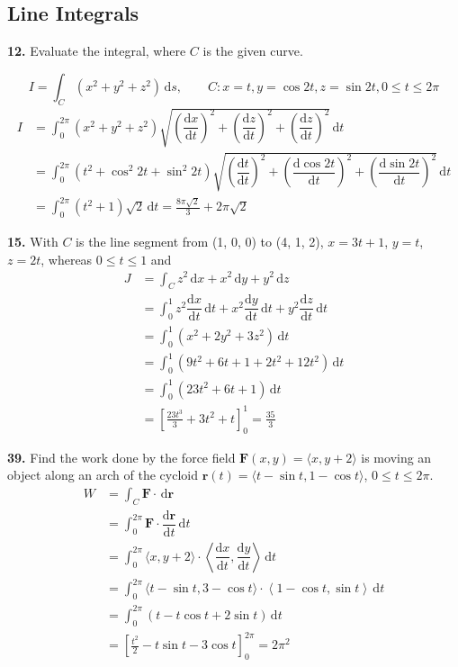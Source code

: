 \documentclass[a4paper,12pt]{article}
\newcommand{\ud}{\,\mathrm{d}}
\newcommand{\leibniz}[3][]{\dfrac{\mathrm{d} #1 #2}{\mathrm{d} #3 #1}}
\newcommand{\exercise}[1]{\noindent\textbf{#1.}}
\begin{document}
\subsection{Line Integrals}
\exercise{12} Evaluate the integral, where $C$ is the given curve.

\[I = \int_C(x^2 + y^2 + z^2)\ud s,\qquad
C: x = t, y = \cos 2t, z = \sin 2t, 0 \leq t \leq 2\pi\]
\begin{align*}
  I &= \int_0^{2\pi}(x^2 + y^2 + z^2)\sqrt{\left(\leibniz{x}{t}\right)^2
  + \left(\leibniz{z}{t}\right)^2 + \left(\leibniz{z}{t}\right)^2}\ud t\\
  &= \int_0^{2\pi}(t^2 + \cos^2 2t + \sin^2 2t)
  \sqrt{\left(\leibniz{t}{t}\right)^2 + \left(\leibniz{\cos 2t}{t}\right)^2
  + \left(\leibniz{\sin 2t}{t}\right)^2}\ud t\\
  &= \int_0^{2\pi}(t^2 + 1)\sqrt 2\ud t = \frac{8\pi\sqrt 2}{3} + 2\pi\sqrt 2
\end{align*}

\exercise{15} With $C$ is the line segment from (1, 0, 0) to (4, 1, 2),
$x = 3t + 1$, $y = t$, $z = 2t$, whereas $0 \leq t \leq 1$ and
\begin{align*}
  J &= \int_C z^2\ud x + x^2\ud y + y^2\ud z\\
  &= \int_0^1 z^2\leibniz{x}{t}\ud t + x^2\leibniz{y}{t}\ud t
  + y^2\leibniz{z}{t}\ud t\\
  &= \int_0^1(x^2 + 2y^2 + 3z^2)\ud t\\
  &= \int_0^1(9t^2 + 6t + 1 + 2t^2 + 12t^2)\ud t\\
  &= \int_0^1(23t^2 + 6t + 1)\ud t\\
  &= \left[\frac{23t^3}{3} + 3t^2 + t\right]_0^1 = \frac{35}{3}
\end{align*}

\exercise{39} Find the work done by the force field
$\mathbf F(x, y) = \langle x, y + 2\rangle$ is moving an object along an arch
of the cycloid $\mathbf r(t) = \langle t-\sin t, 1-\cos t\rangle$,
$0 \leq t \leq 2\pi$.
\begin{align*}
  W &= \int_C\mathbf F\cdot\ud\mathbf r\\
  &= \int_0^{2\pi}\mathbf F\cdot\leibniz{\mathbf r}{t}\ud t\\
  &= \int_0^{2\pi}\langle x, y+2\rangle\cdot
  \left<\leibniz{x}{t}, \leibniz{y}{t}\right>\ud t\\
  &= \int_0^{2\pi}\langle t-\sin t, 3-\cos t\rangle\cdot
  \left<1-\cos t, \sin t\right>\ud t\\
  &= \int_0^{2\pi}\left(t - t\cos t + 2\sin t\right)\ud t\\
  &= \left[\frac{t^2}{2} - t\sin t - 3\cos t\right]_0^{2\pi} = 2\pi^2
\end{align*}
\end{document}
